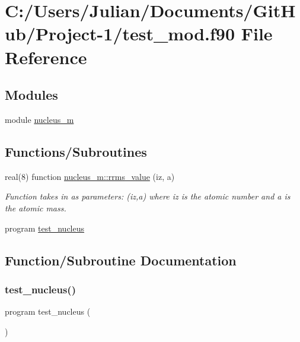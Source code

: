 \hypertarget{test__mod_8f90}{}\section{C\+:/\+Users/\+Julian/\+Documents/\+Git\+Hub/\+Project-\/1/test\+\_\+mod.f90 File Reference}
\label{test__mod_8f90}
\subsection*{Modules}
\begin{DoxyCompactItemize}
\item 
module \mbox{\hyperlink{namespacenucleus__m}{nucleus\+\_\+m}}
\end{DoxyCompactItemize}
\subsection*{Functions/\+Subroutines}
\begin{DoxyCompactItemize}
\item 
real(8) function \mbox{\hyperlink{namespacenucleus__m_aa70383e98e9176269442449160eaaea0}{nucleus\+\_\+m\+::rrms\+\_\+value}} (iz, a)
\begin{DoxyCompactList}\small\item\em Function takes in as parameters\+: (iz,a) where \textquotesingle{}iz\textquotesingle{} is the atomic number and \textquotesingle{}a\textquotesingle{} is the atomic mass. \end{DoxyCompactList}\item 
program \mbox{\hyperlink{test__mod_8f90_a8ebb53a70bcfe3c94dbfbae3e3f52cba}{test\+\_\+nucleus}}
\end{DoxyCompactItemize}


\subsection{Function/\+Subroutine Documentation}
\mbox{\label{test__mod_8f90_a8ebb53a70bcfe3c94dbfbae3e3f52cba}} 
\subsubsection{\texorpdfstring{test\_nucleus()}{test\_nucleus()}}
{\footnotesize\ttfamily program test\+\_\+nucleus (\begin{DoxyParamCaption}{ }\end{DoxyParamCaption})}

